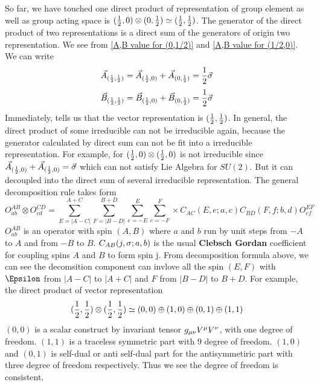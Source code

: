 So far, we have touched one direct product of representation of group element as well as group acting space is 
$(\frac{1}{2},0) \otimes (0,\frac{1}{2}) \simeq (\frac{1}{2},\frac{1}{2})$. The generator of the direct product of two representations is a direct sum of the generators of origin two representation. We see from \eqref{A,B value for (0,1/2)} and \eqref{A,B value for (1/2,0)}. We can write
\begin{equation}
    \vec{A}_{(\frac{1}{2},\frac{1}{2})} 
    = \vec{A}_{(\frac{1}{2},0)} + \vec{A}_{(0,\frac{1}{2})}
    = \frac{1}{2}{\vec{\sigma}}
\end{equation} 
\begin{equation}
    \vec{B}_{(\frac{1}{2},\frac{1}{2})} 
  = \vec{B}_{(\frac{1}{2},0)} + \vec{B}_{(0,\frac{1}{2})}
  = \frac{1}{2}{\vec{\sigma}}
\end{equation}
Immediately, tells us that the vector representation is $(\frac{1}{2},\frac{1}{2})$.
In general, the direct product of some irreducible can not be irreducible again, because the generator calculated by direct sum can not be fit into a irreducible representation. For example, for $(\frac{1}{2},0)\otimes(\frac{1}{2},0)$
is not irreducible since $\vec{A}_{(\frac{1}{2},0)} + \vec{A}_{(\frac{1}{2},0)}
= {\vec{\sigma}}$ which can not satisfy Lie Algebra for $SU(2)$. 
But it can decoupled into the direct sum of several irreducible representation. The general decomposition rule takes form 
\begin{equation}
  O^{AB}_{ab} \otimes O^{CD}_{cd}
  =\sum_{E=|A-C|}^{A+C}
   \sum_{F=|B-D|}^{B+D}
   \sum_{e=-E}^{E}
   \sum_{e=-F}^{F}
   \times
   C_{AC}(E,e;a,c)
   C_{BD}(F,f;b,d)
   O^{EF}_{ef}
\end{equation}
 $O^{AB}_{ab}$ is an operator with spin $(A,B)$ where $a$ and $b$ run by unit steps from $-A$ to $A$ and from $-B$ to $B$. $C_{AB}(j,\sigma;a,b)$ is the usual \textbf{Clebsch Gordan} coefficient for coupling spins $A$ and $B$ to form spin j. From decomposition formula above, we can see the decomsition component can invlove all the spin $(E,F)$ with $\E$ from $|A-C|$ to $|A+C|$ and $F$ from $|B-D|$ to $B+D$. 
 For example, the direct product of vector representation 
 \begin{equation}
 (\frac{1}{2},\frac{1}{2})\otimes(\frac{1}{2},\frac{1}{2}) \simeq (0,0)\oplus(1,0)\oplus(0,1)\oplus(1,1)
 \end{equation} 
 $(0,0)$ is a scalar construct by invariant tensor $g_{\mu\nu}V^{\mu}V^{\nu}$, with one degree of freedom.
 $(1,1)$ is a traceless symmetric part with 9 degree of freedom.
 $(1,0)$ and $(0,1)$ is self-dual or anti self-dual part for the antisymmetiric part with three degree of freedom respectively. Thus we see the degree of freedom is consistent.
 
